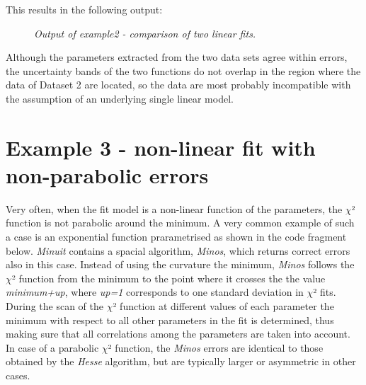 \documentclass[a4paper,10pt,english]{sphinxmanual}
\begin{document}
This results in the following output:
\begin{figure}[htbp]
\centering
\capstart

\caption{\emph{Output of example2 - comparison of two linear fits.}}\end{figure}

Although the parameters extracted from the two data sets agree within
errors, the uncertainty bands of the two functions do not overlap
in the region where the data of Dataset 2 are located, so the data
are most probably incompatible with the assumption of an underlying
single linear model.


\section{Example 3 - non-linear fit with non-parabolic errors}
\label{examples:example-3-non-linear-fit-with-non-parabolic-errors}
Very often, when the fit model is a non-linear function
of the parameters, the \(\chi\)² function is not parabolic around
the minimum. A very common example of such a case is an
exponential function prarametrised as shown in the code
fragment below. \emph{Minuit} contains a spacial algorithm, \emph{Minos},
which returns correct errors also in this case. Instead of
using the curvature the minimum, \emph{Minos} follows the
\(\chi\)² function from the minimum to the point where it
crosses the the value \emph{minimum+up}, where \emph{up=1} corresponds
to one standard deviation in \(\chi\)² fits. During the scan of the
\(\chi\)² function at different values of each parameter the minimum
with respect to all other parameters in the fit is determined,
thus making sure that all correlations among the parameters
are taken into account. In case of a parabolic \(\chi\)² function,
the \emph{Minos} errors are identical to those obtained by
the \emph{Hesse} algorithm, but are typically larger or
asymmetric in other cases.
\end{document}
